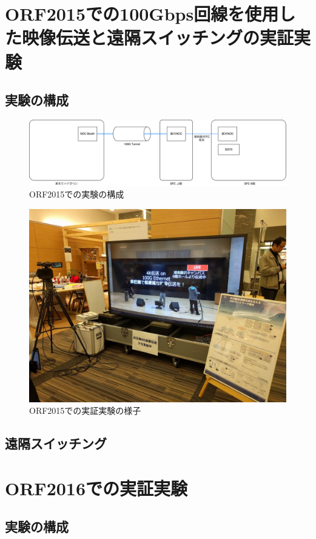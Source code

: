 \chapter{ORF2015での100Gbps回線を使用した映像伝送と遠隔スイッチングの実証実験}
\label{chap:orf2015}

\section{実験の構成}
\begin{figure}[htbp]
    \begin{center}
        \includegraphics[bb=0 0 1101 282,width=15.5cm]{img/orf2015-flow.pdf}
    \end{center}
    \caption{ORF2015での実験の構成}
    \label{fig:orf2015-flow}
\end{figure}

\begin{figure}[htbp]
    \begin{center}
        \includegraphics[bb=0 0 1200 900,width=15.5cm]{img/orf2015-IMG_20151121_132910.jpg}
    \end{center}
    \caption{ORF2015での実証実験の様子}
    \label{fig:orf2015-IMG_20151121_132910}
\end{figure}


\section{遠隔スイッチング}

\chapter{ORF2016での実証実験}
\label{chap:orf2016}
\section{実験の構成}
